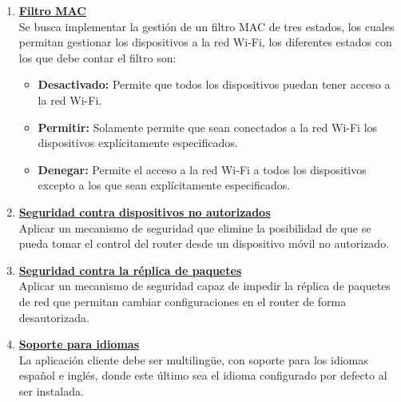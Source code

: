 \begin{enumerate}
        \item \textbf{\underline{Filtro MAC}} \\
            Se busca implementar la gestión de un filtro MAC de tres estados, los cuales permitan gestionar los dispositivos a la red Wi-Fi, los diferentes estados con los que debe contar el filtro son:
            \begin{itemize}
                \item \textbf{Desactivado:} Permite que todos los dispositivos puedan tener acceso a la red Wi-Fi.
                \item \textbf{Permitir:} Solamente permite que sean conectados a la red Wi-Fi los dispositivos explícitamente especificados. 
                \item \textbf{Denegar:} Permite el acceso a la red Wi-Fi a todos los dispositivos excepto a los que sean explícitamente especificados.
            \end{itemize}
        \item \textbf{\underline{Seguridad contra dispositivos no autorizados}} \\
            Aplicar un mecanismo de seguridad que elimine la posibilidad de que se pueda tomar el control del router desde un dispositivo móvil no autorizado.
        \item \textbf{\underline{Seguridad contra la réplica de paquetes}} \\
            Aplicar un mecanismo de seguridad capaz de impedir la réplica de paquetes de red que permitan cambiar configuraciones en el router de forma desautorizada.
        \item \textbf{\underline{Soporte para idiomas}} \\
            La aplicación cliente debe ser multilingüe, con soporte para los idiomas español e inglés, donde este último sea el idioma configurado por defecto al ser instalada.
    \end{enumerate}